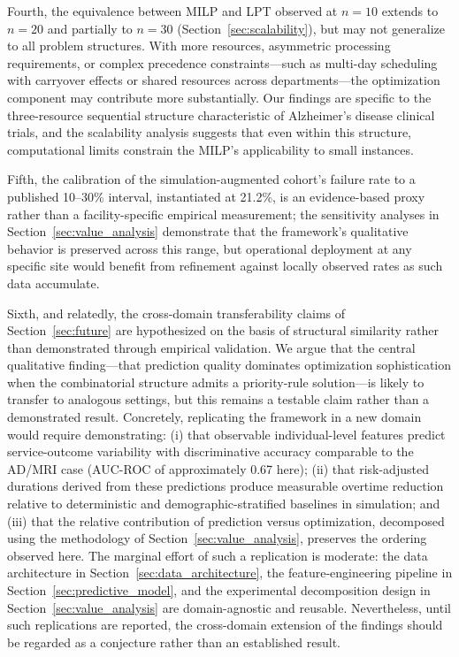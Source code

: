 \documentclass[11pt,a4paper]{article}
\begin{document}
Fourth, the equivalence between MILP and LPT observed at $n = 10$ extends to $n = 20$ and partially to $n = 30$ (Section~\ref{sec:scalability}), but may not generalize to all problem structures. With more resources, asymmetric processing requirements, or complex precedence constraints---such as multi-day scheduling with carryover effects or shared resources across departments---the optimization component may contribute more substantially. Our findings are specific to the three-resource sequential structure characteristic of Alzheimer's disease clinical trials, and the scalability analysis suggests that even within this structure, computational limits constrain the MILP's applicability to small instances.

Fifth, the calibration of the simulation-augmented cohort's failure rate to a published 10--30\% interval, instantiated at 21.2\%, is an evidence-based proxy rather than a facility-specific empirical measurement; the sensitivity analyses in Section~\ref{sec:value_analysis} demonstrate that the framework's qualitative behavior is preserved across this range, but operational deployment at any specific site would benefit from refinement against locally observed rates as such data accumulate.

Sixth, and relatedly, the cross-domain transferability claims of Section~\ref{sec:future} are hypothesized on the basis of structural similarity rather than demonstrated through empirical validation. We argue that the central qualitative finding---that prediction quality dominates optimization sophistication when the combinatorial structure admits a priority-rule solution---is likely to transfer to analogous settings, but this remains a testable claim rather than a demonstrated result. Concretely, replicating the framework in a new domain would require demonstrating: (i) that observable individual-level features predict service-outcome variability with discriminative accuracy comparable to the AD/MRI case (AUC-ROC of approximately 0.67 here); (ii) that risk-adjusted durations derived from these predictions produce measurable overtime reduction relative to deterministic and demographic-stratified baselines in simulation; and (iii) that the relative contribution of prediction versus optimization, decomposed using the methodology of Section~\ref{sec:value_analysis}, preserves the ordering observed here. The marginal effort of such a replication is moderate: the data architecture in Section~\ref{sec:data_architecture}, the feature-engineering pipeline in Section~\ref{sec:predictive_model}, and the experimental decomposition design in Section~\ref{sec:value_analysis} are domain-agnostic and reusable. Nevertheless, until such replications are reported, the cross-domain extension of the findings should be regarded as a conjecture rather than an established result.
\end{document}
